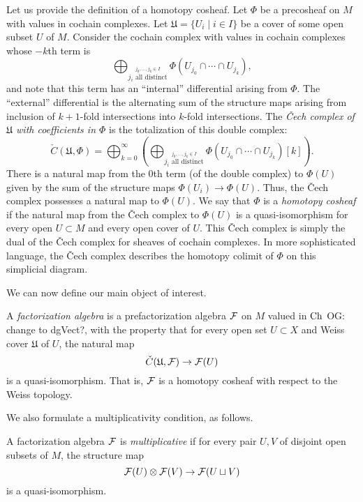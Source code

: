 \documentclass[11pt]{amsart}
\def\owen#1{{\textcolor{violet!65!black}{OG: {#1}}}}
\begin{document}
Let us provide the definition of a homotopy cosheaf. 
Let $\Phi$ be a precosheaf on $M$ with values in cochain complexes. Let $\mathfrak{U} = \{U_i \mid i \in I\}$ be a cover of some open subset $U$ of $M$.  Consider the cochain complex with values in cochain complexes whose $-k$th term is 
\[
\bigoplus_{\stackrel{j_0,\ldots, j_k \in I}{j_i \text{ all distinct}}} \Phi (U_{j_0} \cap \cdots \cap U_{j_k}),
\]
and note that this term has an ``internal'' differential arising from $\Phi$. The ``external'' differential is the alternating sum of the structure maps arising from inclusion of $k+1$-fold intersections into $k$-fold intersections. The \emph{\v{C}ech complex of $\mathfrak{U}$ with coefficients in $\Phi$} is the totalization of this double complex:
$$
\check{C}(\mathfrak{U}, \Phi) = \bigoplus_{k=0}^\infty \left( \bigoplus_{\stackrel{j_0,\ldots, j_k \in I}{j_i \text{ all distinct}}} \Phi (U_{j_0} \cap \cdots \cap U_{j_k}) [ k]   \right).
$$
There is a natural map from the $0$th term (of the double complex) to $\Phi(U)$ given by the sum of the structure maps $\Phi(U_i) \to \Phi(U)$. Thus, the \v{C}ech complex possesses a natural map to $\Phi(U)$. We say that $\Phi$ is a \emph{homotopy cosheaf} if the natural map from the \v{C}ech complex to $\Phi(U)$ is a quasi-isomorphism for every open $U \subset M$ and every open cover of $U$. This \v{C}ech complex is simply the dual of the \v{C}ech complex for sheaves of cochain complexes.
In more sophisticated language, the \v{C}ech complex describes the homotopy colimit of $\Phi$ on this simplicial diagram.

We can now define our main object of interest. 

\begin{dfn}
A \emph{factorization algebra} is a prefactorization algebra $\mathcal F$ on $M$ valued in ${\rm Ch}$ \owen{change to dgVect?}, with the property that for every open set $U \subset X$ and Weiss cover $\mathfrak{U}$ of $U$, the natural map
$$
\check{C}(\mathfrak{U},\mathcal F) \to \mathcal F(U)
$$
is a quasi-isomorphism. That is, $\mathcal F$ is a homotopy cosheaf with respect to the Weiss topology.
\end{dfn}

We also formulate a multiplicativity condition, as follows. 

\begin{dfn}
A factorization algebra $\mathcal F$ is \emph{multiplicative} if for every pair $U,V$ of disjoint open subsets of $M$, the structure map
$$
\mathcal F(U) \otimes \mathcal F(V) \to \mathcal F(U \sqcup V) 
$$
is a quasi-isomorphism.
\end{dfn}
\end{document}
